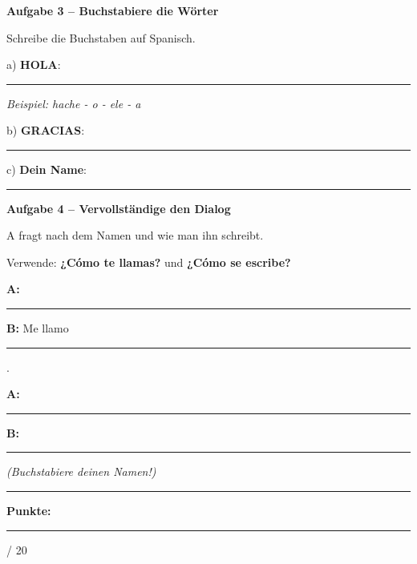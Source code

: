 \documentclass[11pt, a4paper]{article}
\newcommand{\fachfarbe}{spanisch}
\newcommand{\maxpunkte}{20}
\newcommand{\punktebox}[1]{\hfill\fbox{\small \_/#1}}
\newcommand{\luecke}[1]{\rule{#1}{0.4pt}}
\newenvironment{aufgabe}[1]{%
    \needspace{5\baselineskip}%
    \nopagebreak[4]%
    \vspace{10pt}
    \noindent\textbf{\textcolor{\fachfarbe}{Aufgabe #1}}
    \nopagebreak[4]%
    \vspace{5pt}
    \nopagebreak[4]%
    \begin{list}{}{\leftmargin=0pt}
    \item[]
}{%
    \end{list}
}
\newcommand{\es}[1]{\textcolor{\fachfarbe}{\textbf{#1}}}
\begin{document}
\vspace{10pt}


\begin{aufgabe}{3 -- Buchstabiere die Wörter}
Schreibe die Buchstaben auf Spanisch. \punktebox{6}
\end{aufgabe}

\noindent
a) \es{HOLA}: \luecke{8cm}

\vspace{0.5em}
\textit{Beispiel: hache - o - ele - a}

\vspace{1em}

\noindent
b) \es{GRACIAS}: \luecke{8cm}

\vspace{1.5em}

\noindent
c) \textbf{Dein Name}: \luecke{8cm}

\vspace{15pt}


\begin{aufgabe}{4 -- Vervollständige den Dialog}
A fragt nach dem Namen und wie man ihn schreibt. \punktebox{6}
\end{aufgabe}

\begin{hinweis}
Verwende: \es{¿Cómo te llamas?} und \es{¿Cómo se escribe?}
\end{hinweis}

\vspace{0.5em}

\noindent
\textbf{A:} \luecke{10cm}

\vspace{0.8em}

\noindent
\textbf{B:} Me llamo \luecke{4cm}.

\vspace{0.8em}

\noindent
\textbf{A:} \luecke{10cm}

\vspace{0.8em}

\noindent
\textbf{B:} \luecke{10cm}

\textit{(Buchstabiere deinen Namen!)}


\vspace{20pt}
\hrule
\vspace{10pt}

\begin{flushright}
\textbf{Punkte:} \luecke{1cm} / \maxpunkte
\end{flushright}
\end{document}
